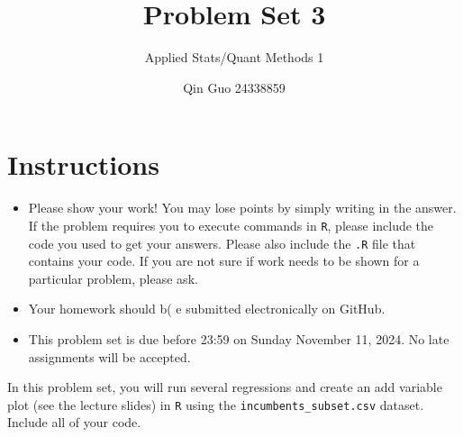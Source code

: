 \documentclass[12pt,letterpaper]{article}
\title{Problem Set 3}
\date{Qin Guo 24338859}
\author{Applied Stats/Quant Methods 1}
\begin{document}
	\maketitle
	\section*{Instructions}
	\begin{itemize}
		\item Please show your work! You may lose points by simply writing in the answer. If the problem requires you to execute commands in \texttt{R}, please include the code you used to get your answers. Please also include the \texttt{.R} file that contains your code. If you are not sure if work needs to be shown for a particular problem, please ask.
	\item Your homework should b( e submitted electronically on GitHub.
	\item This problem set is due before 23:59 on Sunday November 11, 2024. No late assignments will be accepted.

	\end{itemize}

		\vspace{.25cm}
	
\noindent In this problem set, you will run several regressions and create an add variable plot (see the lecture slides) in \texttt{R} using the \texttt{incumbents\_subset.csv} dataset. Include all of your code.

	\vspace{.5cm}
\end{document}
